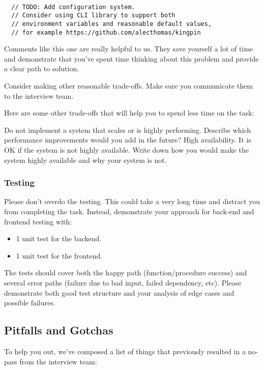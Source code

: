 \documentclass{article}
\begin{document}
\begin{lstlisting}[caption=TODO example]

  // TODO: Add configuration system.
  // Consider using CLI library to support both
  // environment variables and reasonable default values,
  // for example https://github.com/alecthomas/kingpin

\end{lstlisting}

Comments like this one are really helpful to us.
They save yourself a lot of time and demonstrate that you've spent time thinking about this problem and provide a clear path to solution.

Consider making other reasonable trade-offs. Make sure you communicate them to the interview team.

Here are some other trade-offs that will help you to spend less time on the task:

Do not implement a system that scales or is highly performing. Describe which performance improvements would you add in the future?
High availability. It is OK if the system is not highly available. Write down how you would make the system highly available and why your system is not.

\subsubsection*{Testing}

Please don’t overdo the testing. This could take a very long time and distract you from completing the task. Instead, demonstrate your approach for back-end and frontend testing with:

  \begin{itemize}
  \item 1 unit test for the backend.
  \item 1 unit test for the frontend.
  \end{itemize}

The tests should cover both the happy path (function/procedure success) and several error paths (failure due to bad input, failed dependency, etc). Please demonstrate both good test structure and your analysis of edge cases and possible failures.

\subsection{Pitfalls and Gotchas}

  To help you out, we've composed a list of things that previously resulted in a no-pass from the interview team:
\end{document}
